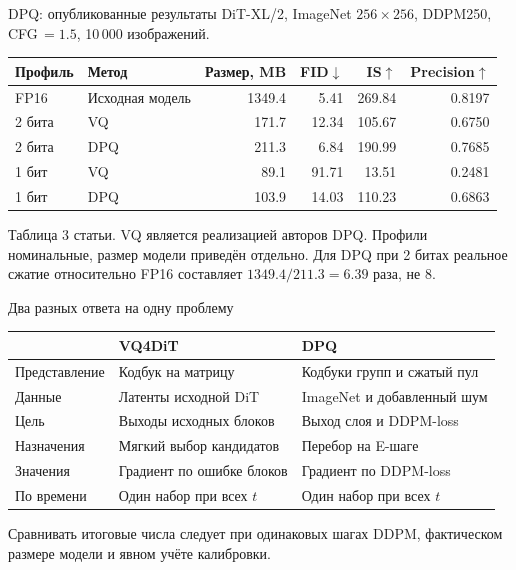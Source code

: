 \documentclass[aspectratio=169,10pt]{beamer}
\newcommand{\takeaway}[1]{\par\vspace{1.5mm}{\bfseries #1\par}}
\newcommand{\smalltext}[1]{{\fontsize{10}{12}\selectfont #1\par}}
\newenvironment{datatable}{\par\begingroup\fontsize{10}{12}\selectfont\setlength{\tabcolsep}{4pt}\renewcommand{\arraystretch}{1.25}}{\par\endgroup}
\begin{document}
\begin{frame}[t]{DPQ: опубликованные результаты}
  DiT-XL/2, ImageNet $256\times256$, DDPM250, CFG\,$=1.5$, 10\,000 изображений.
  \begin{datatable}
    \begin{tabular*}{\textwidth}{@{\extracolsep{\fill}}llrrrr@{}}
      \toprule
      Профиль & Метод & Размер, MB & FID$\downarrow$ & IS$\uparrow$ & Precision$\uparrow$ \\
      \midrule
      FP16 & Исходная модель & 1349.4 & 5.41 & 269.84 & 0.8197 \\
      \midrule
      2 бита & VQ & 171.7 & 12.34 & 105.67 & 0.6750 \\
      2 бита & DPQ & 211.3 & 6.84 & 190.99 & 0.7685 \\
      \midrule
      1 бит & VQ & 89.1 & 91.71 & 13.51 & 0.2481 \\
      1 бит & DPQ & 103.9 & 14.03 & 110.23 & 0.6863 \\
      \bottomrule
    \end{tabular*}
  \end{datatable}
  \smalltext{Таблица 3 статьи. VQ является реализацией авторов DPQ.
  Профили номинальные, размер модели приведён отдельно.
  Для DPQ при 2 битах реальное сжатие относительно FP16 составляет $1349.4/211.3=6.39$ раза, не 8.}
  \takeaway{Особенно сильный выигрыш при 1--2 битах,\par
  но часть улучшения оплачивается большим объёмом кодбуков.}
\end{frame}

\begin{frame}[t]{Два разных ответа на одну проблему}
  \begin{datatable}
    \begin{tabularx}{\textwidth}{@{}L{31mm}XX@{}}
      \toprule
       & VQ4DiT & DPQ \\
      \midrule
      Представление & Кодбук на матрицу & Кодбуки групп и сжатый пул \\
      Данные & Латенты исходной DiT & ImageNet и добавленный шум \\
      Цель & Выходы исходных блоков & Выход слоя и DDPM-loss \\
      Назначения & Мягкий выбор кандидатов & Перебор на E-шаге \\
      Значения & Градиент по ошибке блоков & Градиент по DDPM-loss \\
      По времени & Один набор при всех $t$ & Один набор при всех $t$ \\
      \bottomrule
    \end{tabularx}
  \end{datatable}
  \vspace{2mm}
  \takeaway{VQ4DiT меняет способ выбора вектора и сохраняет признаки блоков.\par
  DPQ расширяет представление и обучает кодбуки на задаче диффузии.}
  \smalltext{Сравнивать итоговые числа следует при одинаковых шагах DDPM,
  фактическом размере модели и явном учёте калибровки.}
\end{frame}
\end{document}

